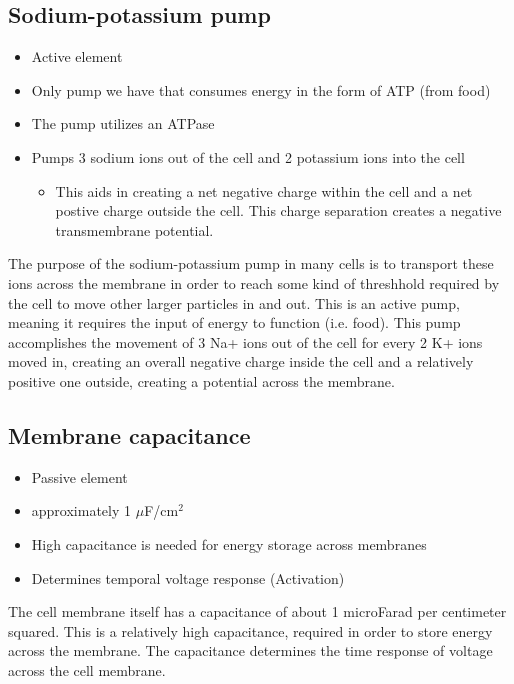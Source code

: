 \documentclass[11pt]{book}
\begin{document}
\subsection{Sodium-potassium pump}
\begin{itemize}
	\item Active element
	\item Only pump we have that consumes energy in the form of ATP (from food)
	\item The pump utilizes an ATPase
	\item Pumps 3 sodium ions out of the cell and 2 potassium ions into the cell
	\begin{itemize}
		\item This aids in creating a net negative charge within the cell and a net postive charge outside the cell. This charge separation creates a negative transmembrane potential.
	\end{itemize}
\end{itemize}

The purpose of the sodium-potassium pump in many cells is to transport these ions across the membrane in order to reach some kind of threshhold required by the cell to move other larger particles in and out. This is an active pump, meaning it requires the input of energy to function (i.e. food). This pump accomplishes the movement of 3 Na+ ions out of the cell for every 2 K+ ions moved in, creating an overall negative charge inside the cell and a relatively positive one outside, creating a potential across the membrane. 

\subsection{Membrane capacitance}
\begin{itemize}
	\item Passive element
	\item approximately 1 $\mu$F/cm$^2$
	\item High capacitance is needed for energy storage across membranes
	\item Determines temporal voltage response (Activation)
\end{itemize}

The cell membrane itself has a capacitance of about 1 microFarad per centimeter squared. This is a relatively high capacitance, required in order to store energy across the membrane. The capacitance determines the time response of voltage across the cell membrane. 
\end{document}
